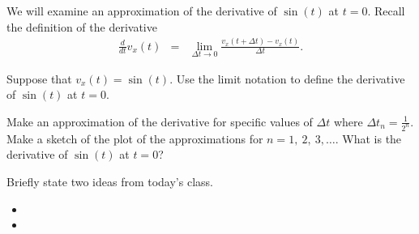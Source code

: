 \begin{problem}
\item We will examine an approximation of the derivative of $\sin(t)$
  at $t=0$.  Recall the definition of the derivative
  \begin{eqnarray*}
    \frac{d}{dt} v_x(t) & = & \lim_{\Delta t \rightarrow 0}
                              \frac{v_x(t+\Delta t) - v_x(t)}{\Delta t}.
  \end{eqnarray*}
  \begin{subproblem}
  \item Suppose that $v_x(t)=\sin(t)$. Use the limit notation to
    define the derivative of $\sin(t)$ at $t=0$.
    \vspace{6em}
  \item Make an approximation of the derivative for specific values of
    $\Delta t$ where $\Delta t_n=\frac{1}{2^n}$. Make a sketch of the
    plot of the approximations for $n=1,~2,~3,\ldots$. What is the
    derivative of $\sin(t)$ at $t=0$?
    \vfill
  \end{subproblem}

\end{problem}

\postClass

\begin{problem}
\item Briefly state two ideas from today's class.
  \begin{itemize}
  \item 
  \item 
  \end{itemize}
\item 
  \begin{subproblem}
    \item
  \end{subproblem}
\end{problem}


\begin{problem}
\item
\end{problem}


